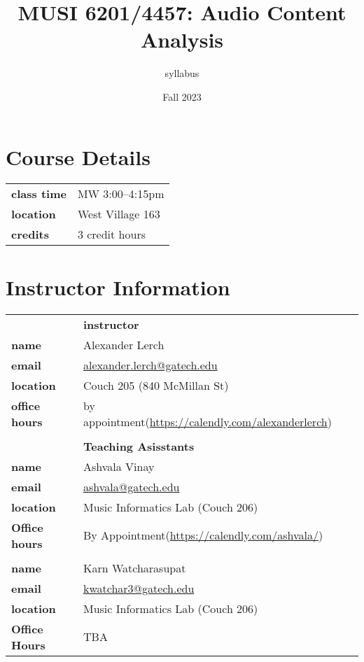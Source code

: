 \documentclass[letterpaper,oneside,10pt]{scrartcl}
\begin{document}
\title{MUSI 6201/4457: Audio Content Analysis}
\author{syllabus }
\date{Fall 2023} %
\maketitle

\pagestyle{plain} %

\section*{Course Details}
    \begin{tabular}{ll}
        \textbf{class time} & MW 3:00--4:15pm \\
        \textbf{location} & West Village 163\\
        \textbf{credits} & 3 credit hours
    \end{tabular}
\section*{Instructor Information}
    \begin{tabular}{lp{70mm}l}
        \textbf{} & \textbf{instructor} & \\%
        \textbf{name} & Alexander Lerch & \\%
        \textbf{email} & \url{alexander.lerch@gatech.edu} & \\%
        \textbf{location} & Couch 205 (840 McMillan St) & \\
        \textbf{office hours} & {by appointment\newline (\url{https://calendly.com/alexanderlerch})} & \\
		& & \\
        \textbf{} & \textbf{Teaching Asisstants}\\
        \textbf{name} & Ashvala Vinay & \\
        \textbf{email} & \url{ashvala@gatech.edu} & \\
        \textbf{location} & Music Informatics Lab (Couch 206) & \\
        \textbf{Office hours} & {By Appointment\newline (\url{https://calendly.com/ashvala/})} &\\
        & & \\
        \textbf{name} & Karn Watcharasupat & \\ 
        \textbf{email} & \url{kwatchar3@gatech.edu} & \\ 
        \textbf{location} & Music Informatics Lab (Couch 206) & \\ 
        \textbf{Office Hours} & TBA 
    \end{tabular}
        
\end{document}
